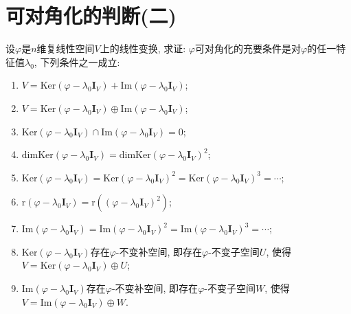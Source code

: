\documentclass[../../main.tex]{subfiles}
\begin{document}
\section{可对角化的判断(二)}

\begin{proposition}\label{proposition:可对角化的补充}
设\(\varphi\)是\(n\)维复线性空间\(V\)上的线性变换, 求证: \(\varphi\)可对角化的充要条件是对\(\varphi\)的任一特征值\(\lambda_{0}\), 下列条件之一成立:
\begin{enumerate}[(1)]
\item \(V = \mathrm{Ker}(\varphi-\lambda_{0}\boldsymbol{I}_{V})+\mathrm{Im}(\varphi-\lambda_{0}\boldsymbol{I}_{V})\);

\item \(V = \mathrm{Ker}(\varphi-\lambda_{0}\boldsymbol{I}_{V})\oplus\mathrm{Im}(\varphi-\lambda_{0}\boldsymbol{I}_{V})\);

\item \(\mathrm{Ker}(\varphi-\lambda_{0}\boldsymbol{I}_{V})\cap\mathrm{Im}(\varphi-\lambda_{0}\boldsymbol{I}_{V}) = 0\);

\item \(\mathrm{dim}\mathrm{Ker}(\varphi-\lambda_{0}\boldsymbol{I}_{V})=\mathrm{dim}\mathrm{Ker}(\varphi-\lambda_{0}\boldsymbol{I}_{V})^{2}\);

\item \(\mathrm{Ker}(\varphi-\lambda_{0}\boldsymbol{I}_{V})=\mathrm{Ker}(\varphi-\lambda_{0}\boldsymbol{I}_{V})^{2}=\mathrm{Ker}(\varphi-\lambda_{0}\boldsymbol{I}_{V})^{3}=\cdots\);

\item \(\mathrm{r}(\varphi-\lambda_{0}\boldsymbol{I}_{V})=\mathrm{r}((\varphi-\lambda_{0}\boldsymbol{I}_{V})^{2})\);

\item \(\mathrm{Im}(\varphi-\lambda_{0}\boldsymbol{I}_{V})=\mathrm{Im}(\varphi-\lambda_{0}\boldsymbol{I}_{V})^{2}=\mathrm{Im}(\varphi-\lambda_{0}\boldsymbol{I}_{V})^{3}=\cdots\);

\item \(\mathrm{Ker}(\varphi-\lambda_{0}\boldsymbol{I}_{V})\)存在\(\varphi\)-不变补空间, 即存在\(\varphi\)-不变子空间\(U\), 使得\(V = \mathrm{Ker}(\varphi-\lambda_{0}\boldsymbol{I}_{V})\oplus U\);

\item \(\mathrm{Im}(\varphi-\lambda_{0}\boldsymbol{I}_{V})\)存在\(\varphi\)-不变补空间, 即存在\(\varphi\)-不变子空间\(W\), 使得\(V = \mathrm{Im}(\varphi-\lambda_{0}\boldsymbol{I}_{V})\oplus W\).
\end{enumerate}
\end{proposition}
\end{document}
